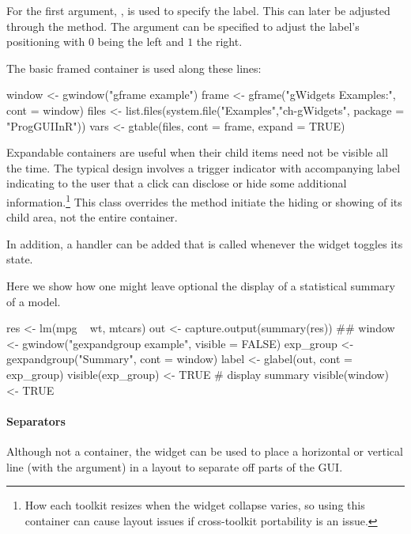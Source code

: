For  the first argument, , is
used to specify the label. This can later be adjusted through the
 method. The argument
 can be specified to adjust the label's
positioning with $0$ being the left and $1$ the right.



The basic framed container is used along these lines:
\begin{Schunk}
\begin{Sinput}
 window <- gwindow("gframe example")
 frame <- gframe("gWidgets Examples:", cont = window)
 files <- list.files(system.file("Examples","ch-gWidgets", 
                                 package = "ProgGUIInR"))
 vars <- gtable(files, cont = frame, expand = TRUE)
\end{Sinput}
\end{Schunk}


Expandable containers are useful when their child items need not be
visible all the time. The typical design involves a trigger indicator
with accompanying label indicating to the user that a click can
disclose or hide some additional information.\footnote{How each
  toolkit resizes when the widget collapse varies, so using this
  container can cause layout issues if cross-toolkit portability is an
  issue.}  This class overrides the
 method initiate
the hiding or showing of its child area, not the entire container.

In addition, a handler can be added that is called whenever the widget
toggles its state.

Here we show how one might leave optional the display of a statistical
summary of a model.
\begin{Schunk}
\begin{Sinput}
 res <- lm(mpg ~ wt, mtcars)
 out <- capture.output(summary(res))
 ##
 window <- gwindow("gexpandgroup example", visible = FALSE)
 exp_group <- gexpandgroup("Summary", cont = window)
 label <- glabel(out, cont = exp_group)
 visible(exp_group) <- TRUE                   # display summary
 visible(window) <- TRUE
\end{Sinput}
\end{Schunk}


\paragraph{Separators}
Although not a container, the  widget can be
used to place a horizontal or vertical line (with the
 argument) in a layout to separate off parts of
the GUI. 




